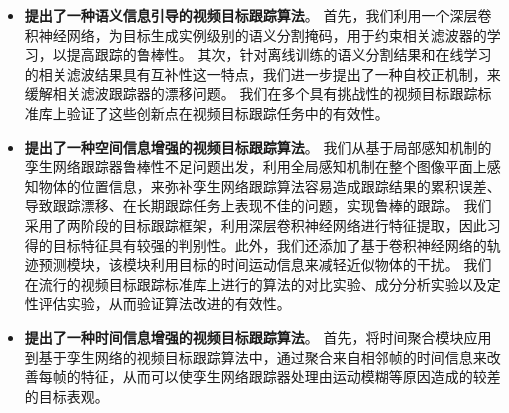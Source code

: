 \begin{itemize}
\item \textbf{提出了一种语义信息引导的视频目标跟踪算法}。
首先，我们利用一个深层卷积神经网络，为目标生成实例级别的语义分割掩码，用于约束相关滤波器的学习，以提高跟踪的鲁棒性。
其次，针对离线训练的语义分割结果和在线学习的相关滤波结果具有互补性这一特点，我们进一步提出了一种自校正机制，来缓解相关滤波跟踪器的漂移问题。
我们在多个具有挑战性的视频目标跟踪标准库上验证了这些创新点在视频目标跟踪任务中的有效性。
\item \textbf{提出了一种空间信息增强的视频目标跟踪算法}。
我们从基于局部感知机制的孪生网络跟踪器鲁棒性不足问题出发，利用全局感知机制在整个图像平面上感知物体的位置信息，来弥补孪生网络跟踪算法容易造成跟踪结果的累积误差、导致跟踪漂移、在长期跟踪任务上表现不佳的问题，实现鲁棒的跟踪。
我们采用了两阶段的目标跟踪框架，利用深层卷积神经网络进行特征提取，因此习得的目标特征具有较强的判别性。此外，我们还添加了基于卷积神经网络的轨迹预测模块，该模块利用目标的时间运动信息来减轻近似物体的干扰。
我们在流行的视频目标跟踪标准库上进行的算法的对比实验、成分分析实验以及定性评估实验，从而验证算法改进的有效性。
\item \textbf{提出了一种时间信息增强的视频目标跟踪算法}。
首先，将时间聚合模块应用到基于孪生网络的视频目标跟踪算法中，通过聚合来自相邻帧的时间信息来改善每帧的特征，从而可以使孪生网络跟踪器处理由运动模糊等原因造成的较差的目标表观。

\end{itemize}
